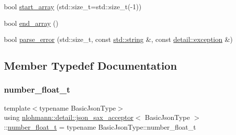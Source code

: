 \begin{DoxyCompactItemize}
bool \mbox{\hyperlink{classnlohmann_1_1detail_1_1json__sax__acceptor_a8238e8090cbb4ed8a22cbc97bfb833a5}{start\+\_\+array}} (std\+::size\+\_\+t=std\+::size\+\_\+t(-\/1))
\item 
bool \mbox{\hyperlink{classnlohmann_1_1detail_1_1json__sax__acceptor_a22ef94ca5476a9563dcaca15b7d6e654}{end\+\_\+array}} ()
\item 
bool \mbox{\hyperlink{classnlohmann_1_1detail_1_1json__sax__acceptor_a95bb3e8b6feaa523ecda8106fb5e38e3}{parse\+\_\+error}} (std\+::size\+\_\+t, const \mbox{\hyperlink{namespacenlohmann_1_1detail_a1ed8fc6239da25abcaf681d30ace4985ab45cffe084dd3d20d928bee85e7b0f21}{std\+::string}} \&, const \mbox{\hyperlink{classnlohmann_1_1detail_1_1exception}{detail\+::exception}} \&)
\end{DoxyCompactItemize}


\subsection{Member Typedef Documentation}
\mbox{\label{classnlohmann_1_1detail_1_1json__sax__acceptor_a5502f483fc60a1bcd73e0e46b6ab36e4}} 
\subsubsection{\texorpdfstring{number\_float\_t}{number\_float\_t}}
{\footnotesize\ttfamily template$<$typename Basic\+Json\+Type$>$ \\
using \mbox{\hyperlink{classnlohmann_1_1detail_1_1json__sax__acceptor}{nlohmann\+::detail\+::json\+\_\+sax\+\_\+acceptor}}$<$ Basic\+Json\+Type $>$\+::\mbox{\hyperlink{classnlohmann_1_1detail_1_1json__sax__acceptor_a5502f483fc60a1bcd73e0e46b6ab36e4}{number\+\_\+float\+\_\+t}} =  typename Basic\+Json\+Type\+::number\+\_\+float\+\_\+t}

\mbox{\label{classnlohmann_1_1detail_1_1json__sax__acceptor_a41876b17c0e8bdb55580eaf5e4e2ded8}} 
